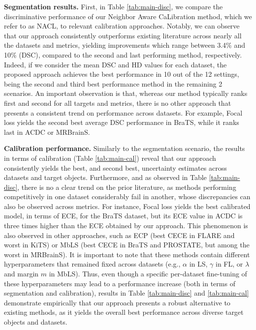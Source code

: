 \documentclass[twocolumn,final,10pt]{elsarticle}
\newcommand{\rev}[1]{{\color{black}#1}}
\begin{document}
\rev{\noindent \textbf{Segmentation results.} First, in Table \ref{tab:main-disc}, we compare the discriminative performance of our Neighbor Aware CaLibration method, which we refer to as NACL, to relevant calibration approaches. Notably, we can observe that our approach consistently outperforms existing literature across nearly all the datasets and metrics, yielding improvements which range between 3.4\% and 10\% (DSC), compared to the second and last performing method, respectively. Indeed, if we consider the mean DSC and HD values for each dataset, the proposed approach achieves the best performance in 10 out of the 12 settings, being the second and third best performance method in the remaining 2 scenarios. An important observation is that, whereas our method typically ranks first and second for all targets and metrics, there is no other approach that presents a consistent trend on performance across datasets. For example, Focal loss yields the second best average DSC performance in BraTS, while it ranks last in ACDC or MRBrainS.}    

\rev{\noindent \textbf{Calibration performance.} Similarly to the segmentation scenario, the results in terms of calibration (Table \ref{tab:main-cal}) reveal that our approach consistently yields the best, and second best, uncertainty estimates across datasets and target objects. Furthermore, and as observed in Table \ref{tab:main-disc}, there is no a clear trend on the prior literature, as methods performing competitively in one dataset considerably fail in another, whose discrepancies can also be observed across metrics. For instance, Focal loss yields the best calibrated model, in terms of ECE, for the BraTS dataset, but its ECE value in ACDC is three times higher than the ECE obtained by our approach. This phenomenon is also observed in other approaches, such as ECP (best CECE in FLARE and worst in KiTS) or MbLS (best CECE in BraTS and PROSTATE, but among the worst in MRBrainS). It is important to note that these methods contain different hyperparameters that remained fixed across datasets %
(e.g., $\alpha$ in LS, $\gamma$ in FL, or $\lambda$ and margin $m$ in MbLS). Thus, even though a specific per-dataset fine-tuning of these hyperparameters may lead to a performance increase (both in terms of segmentation and calibration), results in Table \ref{tab:main-disc} and \ref{tab:main-cal} demonstrate empirically that our approach presents a robust alternative to existing methods, as it yields the overall best performance across diverse target objects and datasets.}
\end{document}
